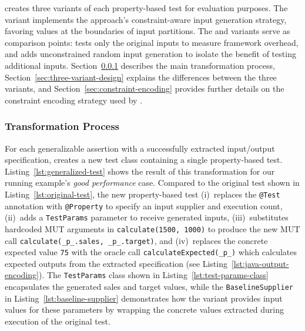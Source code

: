 \ToolTeralizer{} creates three variants of each property-based test for evaluation purposes.
The \VariantImproved{} variant implements the approach's constraint-aware input generation strategy,
favoring values at the boundaries of input partitions.
The \VariantBaseline{} and \VariantNaive{} variants serve as comparison points:
\VariantBaseline{} tests only the original inputs to measure framework overhead,
and \VariantNaive{} adds unconstrained random input generation
to isolate the benefit of testing additional inputs.
Section~\ref{sec:transformation-pipeline} describes the main transformation process,
Section~\ref{sec:three-variant-design} explains the differences between the three variants,
and Section~\ref{sec:constraint-encoding} provides further details
on the constraint encoding strategy used by \VariantImproved{}.

\subsubsection{Transformation Process}
\label{sec:transformation-pipeline}

For each generalizable assertion with a successfully extracted input/output specification,
\ToolTeralizer{} creates a new test class containing a single property-based test.
Listing~\ref{lst:generalized-test} shows the result of this transformation
for our running example's \textit{good performance} case.
Compared to the original test shown in Listing~\ref{lst:original-test},
the new property-based test
(i)~replaces the \texttt{@Test} annotation with \texttt{@Property}
to specify an input supplier and execution count,
(ii)~adds a \texttt{TestParams} parameter to receive generated inputs,
(iii)~substitutes hardcoded MUT arguments in \texttt{calculate(1500, 1000)}
to produce the new MUT call \texttt{calculate(\_p\_.sales, \_p\_.target)},
and (iv)~replaces the concrete expected value \texttt{75} with the oracle call \texttt{calculateExpected(\_p\_)}
which calculates expected outputs from the extracted specification (see Listing~\ref{lst:java-output-encoding}).
The \texttt{TestParams} class shown in Listing~\ref{lst:test-params-class}
encapsulates the generated sales and target values,
while the \texttt{BaselineSupplier} in Listing~\ref{lst:baseline-supplier}
demonstrates how the \VariantBaseline{} variant provides input values for these parameters
by wrapping the concrete values extracted during \ToolSPF{} execution of the original test.

